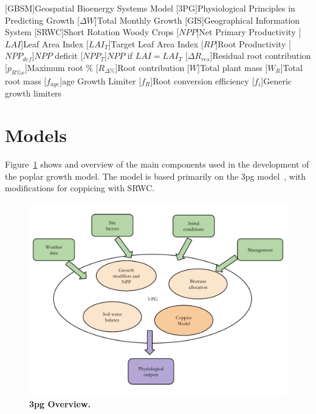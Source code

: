 \documentclass[10pt]{article}
\begin{document}
[\textsc{GBSM}]{Geospatial Bioenergy Systems Model}
[\textsc{3PG}]{Physiological Principles in Predicting Growth}
[\ensuremath{\Delta W}]{Total Monthly Growth}
[\textsc{GIS}]{Geographical Information System}
[\textsc{SRWC}]{Short Rotation Woody Crops}
[\ensuremath{NPP}]{Net Primary Productivity}
[\ensuremath{LAI}]{Leaf Area Index}
[\ensuremath{LAI_{T}}]{Target Leaf Area Index}
[\ensuremath{RP}]{Root Productivity}
[\ensuremath{NPP_{def}}]{$NPP$ deficit}
[\ensuremath{NPP_{T}}]{$NPP$ if $LAI = LAI_{T}$}
[\ensuremath{\Delta R_{res}}]{Residual root contribution}
[\ensuremath{p_{R\%x}}]{Maximum root \%}
[\ensuremath{R_{\Delta\%}}]{Root contribution}
[\ensuremath{W}]{Total plant mass}
[\ensuremath{W_R}]{Total root mass}
[\ensuremath{f_{age}}]{age Growth Limiter}
[\ensuremath{f_R}]{Root conversion efficiency}
[\ensuremath{f_i}]{Generic growth limiters}

\section*{Models}

Figure~\ref{fig:growth-model} shows and overview of the main
components used in the development of the poplar growth model. The
model is based primarily on the \acf{3pg} model~\cite{Landsberg1997,
  landsberg2010physiological}, with modifications for coppicing with
\ac{SRWC}.

\begin{figure}[!ht]
\includegraphics[width=0.5\linewidth]{model_overview}
\caption{ \textbf{\ac{3pg} Overview.}}
\label{fig:growth-model}
\end{figure}
\end{document}
